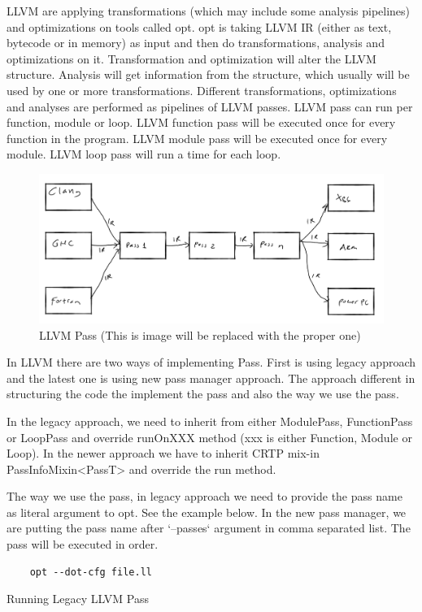 LLVM are applying transformations (which may include some analysis pipelines) and optimizations on tools called opt. opt is taking LLVM IR (either as text, bytecode or in memory) as input and then do transformations, analysis and optimizations on it. Transformation and optimization will alter the LLVM structure. Analysis will get information from the structure, which usually will be used by one or more transformations. Different transformations, optimizations and analyses are performed as pipelines of LLVM passes. LLVM pass can run per function, module or loop. LLVM function pass will be executed once for every function in the program. LLVM module pass will be executed once for every module. LLVM loop pass will run a time for each loop. 

\begin{figure}[htbp]
\centerline{\includegraphics[scale=.25]{Figures/llvm.png}}
\caption{LLVM Pass (This is image will be replaced with the proper one)}
\label{fig:2-2}
\end{figure}

In LLVM there are two ways of implementing Pass. First is using legacy approach and the latest one is using new pass manager approach. The approach different in structuring the code the implement the pass and also the way we use the pass. 

In the legacy approach, we need to inherit from either ModulePass, FunctionPass or LoopPass and override runOnXXX method (xxx is either Function, Module or Loop). In the newer approach we have to inherit CRTP mix-in PassInfoMixin<PassT> and override the run method.

The way we use the pass, in legacy approach we need to provide the pass name as literal argument to opt. See the example below. In the new pass manager, we are putting the pass name after `--passes` argument in comma separated list. The pass will be executed in order.

\begin{listing}
\begin{verbatim}
    opt --dot-cfg file.ll 
\end{verbatim}
\caption{Running Legacy LLVM Pass}    
\label{listing:2-3}
\end{listing}

